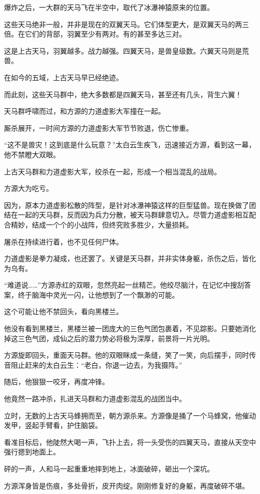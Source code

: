\begin{this_body}
爆炸之后，一大群的天马飞在半空中，取代了冰瀑神猿原来的位置。

这些天马绝非一般，并非是现在的双翼天马。它们体型更大，是双翼天马的两三倍。在它们的背部，羽翼至少有两对。有的甚至多达三对。

这是上古天马，羽翼越多。战力越强。四翼天马，是兽皇级数。六翼天马则是荒兽。

在如今的五域，上古天马早已经绝迹。

而此刻，这些天马群中，绝大多数都是四翼天马，甚至还有几头，背生六翼！

天马群呼啸而过，和方源的力道虚影大军撞在一起。

厮杀展开，一时间方源的力道虚影大军节节败退，伤亡惨重。

“这不是兽灾！这到底是什么玩意？”太白云生疾飞，迅速接近方源，看到这一幕，他不禁瞪大双眼。

上古天马群和力道虚影大军，绞杀在一起，形成一个相当混乱的战局。

方源大为吃亏。

因为，原本力道虚影松散的阵型，是针对冰瀑神猿这样的巨型猛兽。现在换做了团结在一起的天马群，反而因为兵力分散，被天马群肆意切入。尽管力道虚影相互配合精妙，结成一个个的小战阵，但终究败多胜少，大量损耗。

屠杀在持续进行着，也不见任何尸体。

力道虚影是拳力凝成，也还罢了。关键是天马群，并非实体身躯，杀伤之后，皆化为乌有。

“难道说……”方源赤红的双眼，忽然亮起一丝精芒。他绞尽脑汁，在记忆中搜刮答案，终于脑海中灵光一闪，让他想到了一个飘渺的可能。

这个可能让他不禁回头，看向黑楼兰。

他没有看到黑楼兰，黑楼兰被一团庞大的三色气团包裹着，不见踪影。只要她消化掉这三色气团，成仙之后的潜力势必将极为深厚，前景将一片光明。

方源旋即回头，重面天马群。他的双眼眯成一条缝，笑了一笑，向后摆手，同时传音阻止赶来的太白云生：“老白，你退一边去，为我摄阵。”

随后，他狠狠一咬牙，再度冲锋。

他竟然一路冲杀，扎进天马群和力道虚影混乱的战团当中。

立时，无数的上古天马蜂拥而至，朝方源杀来。方源像是捅了一个马蜂窝，他催动发甲，竖起手臂看，护住脑袋。

看准目标后，他陡然大喝一声，飞扑上去，将一头受伤的四翼天马，直接从天空中强行摁到地面上。

砰的一声，人和马一起重重地摔到地上，冰面破碎，砸出一个深坑。

方源浑身皆是伤痕，多处骨折，皮开肉绽。刚刚修复好的身躯，再度破碎不堪。


\end{this_body}
